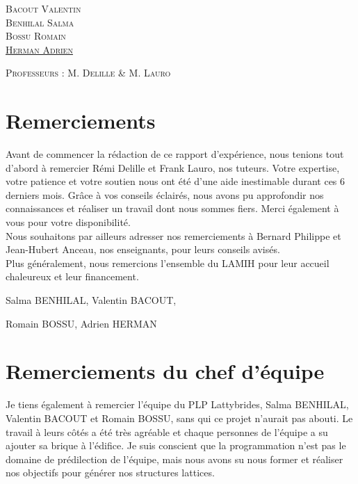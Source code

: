 \documentclass[a4paper]{article}
\begin{document}
\begin{titlepage}
\begin{center}
			\begin{minipage}{1\textwidth}\large
				\textsc{Bacout Valentin}\\
				\textsc{Benhilal Salma}\\
				\textsc{Bossu Romain}\\
				\textsc{\underline{Herman Adrien}}
				\begin{flushright}
				\textsc{{Professeurs : M. Delille \& M. Lauro}}
				\end{flushright}
			\end{minipage}
		\end{center}
	\end{titlepage}
	
	\section*{Remerciements}
	
	\hspace{0.5cm}Avant de commencer la rédaction de ce rapport d'expérience, nous tenions tout d’abord à remercier Rémi Delille et Frank Lauro, nos tuteurs. Votre expertise, votre patience et votre soutien nous ont été d'une aide inestimable durant ces 6 derniers mois. Grâce à vos conseils éclairés, nous avons pu approfondir nos connaissances et réaliser un travail dont nous sommes fiers. Merci également à vous pour votre disponibilité.\\
	
	Nous souhaitons par ailleurs adresser nos remerciements à Bernard Philippe et Jean-Hubert Anceau, nos enseignants, pour leurs conseils avisés.\\
	
	Plus généralement, nous remercions l’ensemble du LAMIH pour leur accueil chaleureux et leur financement.\\
	
	\begin{flushright}
		Salma BENHILAL, Valentin BACOUT,
		
		Romain BOSSU, Adrien HERMAN
	\end{flushright}
	
	\section*{Remerciements du chef d'équipe}
	
	\hspace{0.5cm}Je tiens également à remercier l'équipe du PLP Lattybrides, Salma BENHILAL, Valentin BACOUT et Romain BOSSU, sans qui ce projet n'aurait pas abouti. Le travail à leurs côtés a été très agréable et chaque personnes de l'équipe a su ajouter sa brique à l'édifice. Je suis conscient que la programmation n'est pas le domaine de prédilection de l'équipe, mais nous avons su nous former et réaliser nos objectifs pour générer nos structures lattices.\\
	
\end{document}
